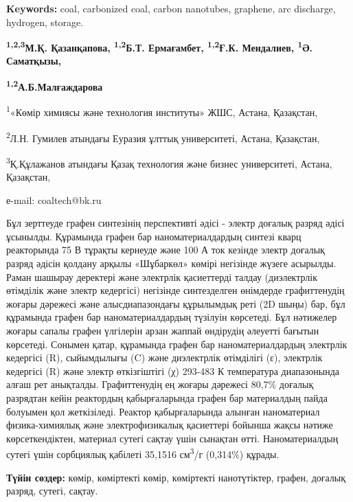 {\bfseries Keywords:} coal, carbonized coal, carbon nanotubes, graphene,
arc discharge, hydrogen, storage.


\begin{center}
{\bfseries \textsuperscript{1,2,3}М.Қ. Қазанқапова,
\textsuperscript{1,2}Б.Т. Ермағамбет\envelope, \textsuperscript{1,2}Ғ.К.
Мендалиев, \textsuperscript{1}Ә. Саматқызы,}

{\bfseries \textsuperscript{1,2}А.Б.Малғаждарова}

\textsuperscript{1}«Көмір химиясы және технология институты» ЖШС,
Астана, Қазақстан,

\textsuperscript{2}Л.Н. Гумилев атындағы Еуразия ұлттық университеті,
Астана, Қазақстан,

\textsuperscript{3}Қ.Құлажанов атындағы Қазақ технология және бизнес
университеті, Астана, Қазақстан,

е-mail: coaltech@bk.ru
\end{center}

Бұл зерттеуде графен синтезінің перспективті әдісі - электр доғалық
разряд әдісі ұсынылды. Құрамында графен бар наноматериалдардың синтезі
кварц реакторында 75 В тұрақты кернеуде және 100 А ток кезінде электр
доғалық разряд әдісін қолдану арқылы «Шұбаркөл» көмірі негізінде жүзеге
асырылды. Раман шашырау деректері және электрлік қасиеттерді талдау
(диэлектрлік өтімділік және электр кедергісі) негізінде синтезделген
өнімдерде графиттенудің жоғары дәрежесі және алысдиапазондағы құрылымдық
реті (2D шыңы) бар, бұл құрамында графен бар наноматериалдардың түзілуін
көрсетеді. Бұл нәтижелер жоғары сапалы графен үлгілерін арзан жаппай
өндірудің әлеуетті бағытын көрсетеді. Сонымен қатар, құрамында графен
бар наноматериалдардың электрлік кедергісі (R), сыйымдылығы (C) және
диэлектрлік өтімділігі (ε), электрлік кедергісі (R) және электр
өткізгіштігі (χ) 293-483 К температура диапазонында алғаш рет анықталды.
Графиттенудің ең жоғары дәрежесі 80,7\% доғалық разрядтан кейін
реактордың қабырғаларында графен бар материалдың пайда болуымен қол
жеткізіледі. Реактор қабырғаларында алынған наноматериал физика-химиялық
және электрофизикалық қасиеттері бойынша жақсы нәтиже көрсеткендіктен,
материал сутегі сақтау үшін сынақтан өтті. Наноматериалдың сутегі үшін
сорбциялық қабілеті 35,1516 см\textsuperscript{3}/г (0,314\%) құрады.

{\bfseries Түйін сөздер:} көмір, көміртекті көмір, көміртекті нанотүтіктер,
графен, доғалық разряд, сутегі, сақтау.


